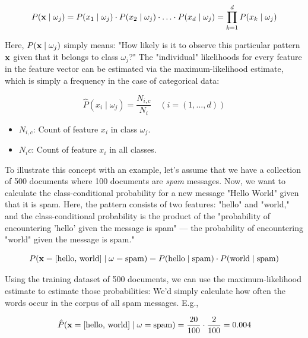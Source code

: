 \documentclass{article}
\begin{document}
\begin{equation} P(\textbf x \mid \omega_j) = P(x_1 \mid \omega_j) \cdot P(x_2 \mid \omega_j) \cdot \ldots \cdot P(x_d \mid \omega_j) =  \prod_{k=1}^{d} P( x_k \mid \omega_j) \end{equation}

Here, $P(\textbf x \mid \omega_j)$ simply means: "How likely is it to observe this particular pattern $\textbf x$ given that it belongs to class $ \omega_j$?" The "individual" likelihoods for every feature in the feature vector can be estimated via the maximum-likelihood estimate, which is simply a frequency in the case of categorical data:
    
\begin{equation} \hat{P}(x_i \mid \omega_j) = \frac{N_{i,c}}{N_i}  \quad (i = (1, ..., d))\end{equation}

\begin{itemize}
	\item $N_{i,c}$: Count of feature $x_i$ in class $\omega_j$.
	\item  $N_ic$: Count of feature $x_i$ in all classes.
\end{itemize}

To illustrate this concept with an example, let's assume that we have a collection of 500 documents where 100 documents are \emph{spam} messages. Now, we want to calculate the class-conditional probability for a new message "Hello World" given that it is spam.
Here, the pattern consists of two features: "hello" and "world," and the class-conditional probability is the product of the "probability of encountering 'hello' given the message is spam" --- the probability of encountering "world" given the message is spam."

\begin{equation} P(\textbf x=[\text{hello, world}] \mid \omega=\text{spam}) = P(\text{hello} \mid \text{spam}) \cdot P(\text{world} \mid \text{spam}) \end{equation}


Using the training dataset of 500 documents, we can use the maximum-likelihood estimate to estimate those probabilities: We'd simply calculate how often the words occur in the corpus of all spam messages. E.g., 


\begin{equation} \hat{P}(\textbf x=[\text{hello, world}] \mid \omega=\text{spam}) = \frac{20}{100} \cdot \frac{2}{100} = 0.004 \end{equation}
\end{document}
